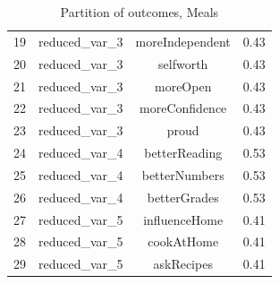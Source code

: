 \begin{frame}[fragile]
\begin{frame}[fragile]
\begin{frame}[fragile]
\begin{table}[ht]
\begin{tabular}{lccc}
  19 & reduced\_var\_3 & moreIndependent & 0.43 \\ 
  20 & reduced\_var\_3 & selfworth & 0.43 \\ 
  21 & reduced\_var\_3 & moreOpen & 0.43 \\ 
  22 & reduced\_var\_3 & moreConfidence & 0.43 \\ 
  23 & reduced\_var\_3 & proud & 0.43 \\ 
  24 & reduced\_var\_4 & betterReading & 0.53 \\ 
  25 & reduced\_var\_4 & betterNumbers & 0.53 \\ 
  26 & reduced\_var\_4 & betterGrades & 0.53 \\ 
  27 & reduced\_var\_5 & influenceHome & 0.41 \\ 
  28 & reduced\_var\_5 & cookAtHome & 0.41 \\ 
  29 & reduced\_var\_5 & askRecipes & 0.41 \\ 
   \hline
\end{tabular}
\caption{Partition of outcomes, Meals} 
\label{partitionmeals}
\end{table}


 \end{frame}


\end{frame}
\end{frame}
